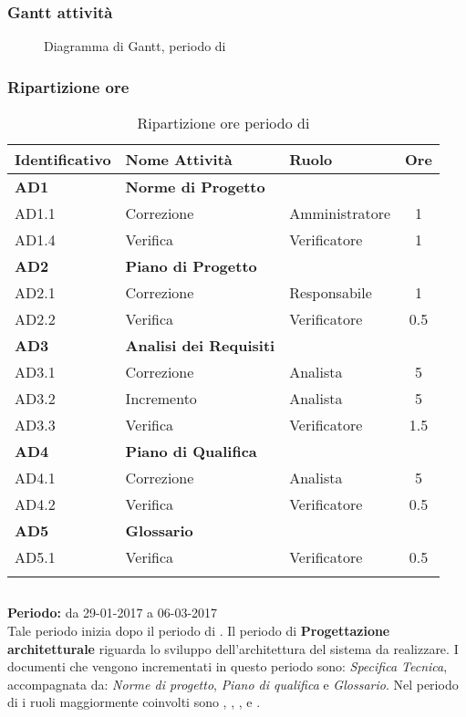 \subsubsection{Gantt attività}
\begin{figure}[H]
	\centering
	\caption{Diagramma di Gantt, periodo di \AD{}}
\end{figure}

\subsubsection{Ripartizione ore}
\bgroup
\begin{longtable}{|l|l|l|c|}
	\endfirsthead
	\hline
	\textbf{Identificativo} &
	\textbf{Nome Attività} &
	\textbf{Ruolo} &
	\textbf{Ore}\\
	\endhead
	\hline
	\textbf{AD1} & \textbf{Norme di Progetto} &  &  \\
		\hline
		{AD1.1} & {Correzione} & Amministratore  & 1\\
		\hline
		{AD1.4} & {Verifica} & Verificatore & 1 \\
		\hline
	\textbf{AD2} & \textbf{Piano di Progetto}  & & \\
	\hline
		{AD2.1} & {Correzione} & Responsabile &  1\\
		\hline
		{AD2.2} & {Verifica} & Verificatore & 0.5 \\
		\hline
	\textbf{AD3} & \textbf{Analisi dei Requisiti} & &  \\
		\hline
		{AD3.1} & {Correzione} & Analista  &  5\\
		\hline
		{AD3.2} & {Incremento} & Analista  &  5\\
		\hline
		{AD3.3} & {Verifica} & Verificatore  &  1.5\\
		\hline
	\textbf{AD4} & \textbf{Piano di Qualifica} & &  \\
	\hline
		{AD4.1} & {Correzione} & Analista &  5 \\
		\hline
		{AD4.2} & {Verifica} & Verificatore &  0.5 \\
		\hline
	\textbf{AD5} & \textbf{Glossario} & &  \\
	\hline
		{AD5.1} & {Verifica} & Verificatore &  0.5 \\
	\hline
	\caption{Ripartizione ore periodo di \AD{}}
\end{longtable}
\egroup

\subsection{\PA{}}
\textbf{Periodo:} da 29-01-2017 a 06-03-2017 \\
Tale periodo inizia dopo il periodo di \AD{}. Il periodo di \textbf{Progettazione architetturale} riguarda lo sviluppo dell'architettura del sistema da realizzare. I documenti che vengono incrementati in questo periodo sono: \textit{Specifica Tecnica}, accompagnata da: \textit{Norme di progetto}, \textit{Piano di qualifica} e \textit{Glossario}.
Nel periodo di \PA{} i ruoli maggiormente coinvolti sono \Progettista{}, \Responsabile{}, \Amministratore{}, \Analista{} e \Verificatore{}.
